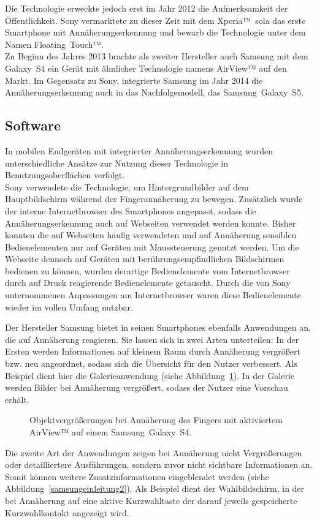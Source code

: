 \documentclass[12pt,numbers=noenddot,parskip,bibliography=totocnumbered,listof=totocnumbered]{scrreprt}
\begin{document}
Die Technologie erweckte jedoch erst im Jahr 2012 die Aufmerksamkeit der Öffentlichkeit. Sony vermarktete zu dieser Zeit mit dem \mbox{Xperia™ sola} das erste Smartphone mit Annäherungserkennung und bewarb die Technologie unter dem Namen \mbox{Floating Touch™}.\\
Zu Beginn des Jahres 2013 brachte als zweiter Hersteller auch Samsung mit dem \mbox{Galaxy S4} ein Gerät mit ähnlicher Technologie namens \mbox{AirView™} auf den Markt. Im Gegensatz zu Sony, integrierte Samsung im Jahr 2014 die Annäherungserkennung auch in das Nachfolgemodell, das \mbox{Samsung Galaxy S5}.

\subsection{Software}
In mobilen Endgeräten mit integrierter Annäherungserkennung wurden unterschiedliche Ansätze zur Nutzung dieser Technologie in Benutzungsoberflächen verfolgt.\\
Sony verwendete die Technologie, um Hintergrundbilder auf dem Hauptbildschirm während der Fingerannäherung zu bewegen. Zusätzlich wurde der interne Internetbrowser des Smartphones angepasst, sodass die Annäherungserkennung auch auf Webseiten verwendet werden konnte. Bisher konnten die auf Webseiten häufig verwendeten und auf Annäherung sensiblen Bedienelementen nur auf Geräten mit Maussteuerung genutzt werden. Um die Webseite dennoch auf Geräten mit berührungsempfindlichen Bildschirmen bedienen zu können, wurden derartige Bedienelemente vom Internetbrowser durch auf Druck reagierende Bedienelemente getauscht. Durch die von Sony unternommenen Anpassungen am Internetbrowser waren diese Bedienelemente wieder im vollen Umfang nutzbar.

Der Hersteller Samsung bietet in seinen Smartphones ebenfalls Anwendungen an, die auf Annäherung reagieren. Sie lassen sich in zwei Arten unterteilen: In der Ersten werden Informationen auf kleinem Raum durch Annäherung vergrößert bzw. neu angeordnet, sodass sich die Übersicht für den Nutzer verbessert. Als Beispiel dient hier die Galerieanwendung (siehe Abbildung~\ref{samsungeinleitung1}). In der Galerie werden Bilder bei Annäherung vergrößert, sodass der Nutzer eine Vorschau erhält.
\begin{figure}
\centering
{}%
\hfill
{}%
\caption{Objektvergrößerungen bei Annäherung des Fingers mit aktiviertem \mbox{AirView™} auf einem \mbox{Samsung Galaxy S4}.}
\label{samsungeinleitung1}
\end{figure}
Die zweite Art der Anwendungen zeigen bei Annäherung nicht Vergrößerungen oder detailliertere Ausführungen, sondern zuvor nicht sichtbare Informationen an. Somit können weitere Zusatzinformationen eingeblendet werden (siehe Abbildung~\ref{samsungeinleitung2}). Als Beispiel dient der Wahlbildschirm, in der bei Annäherung auf eine aktive Kurzwahltaste der darauf jeweils gespeicherte Kurzwahlkontakt angezeigt wird.
\end{document}
